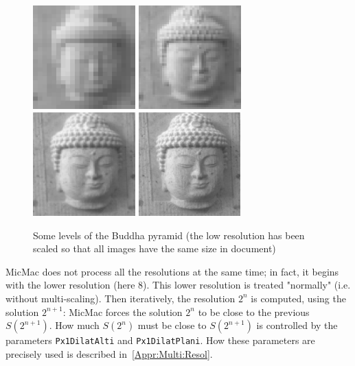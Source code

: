 \begin{figure}
\includegraphics[height=40mm]{FIGS/Boudhas/Pyr32.jpg}
\includegraphics[height=40mm]{FIGS/Boudhas/Pyr16.jpg}
\includegraphics[height=40mm]{FIGS/Boudhas/Pyr8.jpg}
\includegraphics[height=40mm]{FIGS/Boudhas/Pyr4.jpg}
\caption{Some levels of the Buddha pyramid (the low resolution has been scaled so
     that all images have the same size in document)}
\label{FIG:IM:MULRES}
\end{figure}

MicMac does not process all the resolutions at the same time; in fact, it begins
with the lower resolution (here $8$). This lower resolution is treated "normally"
(i.e. without multi-scaling). Then iteratively, the resolution $2^n$ is computed,
using the solution $2^{n+1}$: MicMac forces the solution $2^n$ to be close
to the previous $S(2^{n+1})$. How much $S(2^n)$ must be close to  $S(2^{n+1})$ is
controlled by the parameters {\tt Px1DilatAlti} and {\tt Px1DilatPlani}.
How these parameters are precisely used is described in~\ref{Appr:Multi:Resol}.

